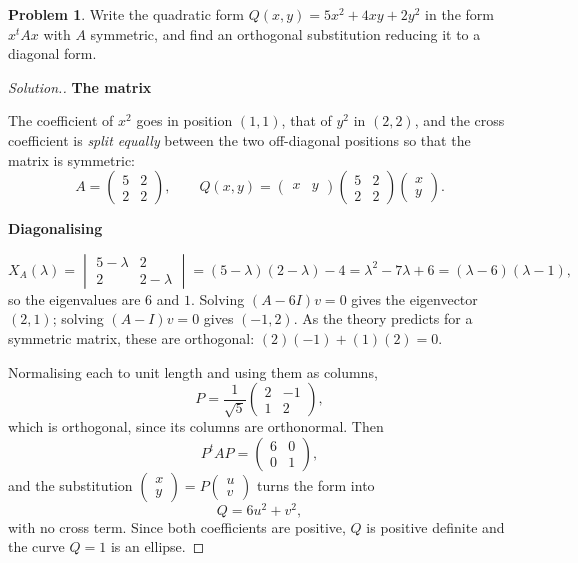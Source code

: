 \documentclass[11pt,a4paper]{article}
\theoremstyle{definition}
\newtheorem{problemx}{Problem}[section]
\newenvironment{problem}{\begin{problemx}}{\end{problemx}}
\newenvironment{solution}
  {\renewcommand{\qedsymbol}{}\begin{proof}[\textit{Solution}.]}
  {\end{proof}}
\newcommand{\subhead}[1]{%
  \par\medskip\noindent\textbf{#1}\par\nobreak\smallskip}
\begin{document}
\begin{problem}
Write the quadratic form $Q(x,y)=5x^2+4xy+2y^2$ in the form $x^tAx$ with $A$
symmetric, and find an orthogonal substitution reducing it to a diagonal form.
\end{problem}
\begin{solution}
\subhead{The matrix}
The coefficient of $x^2$ goes in position $(1,1)$, that of $y^2$ in $(2,2)$,
and the cross coefficient is \emph{split equally} between the two off-diagonal
positions so that the matrix is symmetric:
$$A=\begin{pmatrix}5&2\\2&2\end{pmatrix},\qquad
Q(x,y)=\begin{pmatrix}x&y\end{pmatrix}
\begin{pmatrix}5&2\\2&2\end{pmatrix}
\begin{pmatrix}x\\y\end{pmatrix}.$$

\subhead{Diagonalising}
$$X_A(\lambda)=\begin{vmatrix}5-\lambda&2\\2&2-\lambda\end{vmatrix}
=(5-\lambda)(2-\lambda)-4=\lambda^2-7\lambda+6=(\lambda-6)(\lambda-1),$$
so the eigenvalues are $6$ and $1$. Solving $(A-6I)v=0$ gives the eigenvector
$(2,1)$; solving $(A-I)v=0$ gives $(-1,2)$. As the theory predicts for a
symmetric matrix, these are orthogonal: $(2)(-1)+(1)(2)=0$.

Normalising each to unit length and using them as columns,
$$P=\frac{1}{\sqrt5}\begin{pmatrix}2&-1\\1&2\end{pmatrix},$$
which is orthogonal, since its columns are orthonormal. Then
$$P^tAP=\begin{pmatrix}6&0\\0&1\end{pmatrix},$$
and the substitution $\begin{pmatrix}x\\y\end{pmatrix}=P\begin{pmatrix}u\\v\end{pmatrix}$
turns the form into
$$Q=6u^2+v^2,$$
with no cross term. Since both coefficients are positive, $Q$ is positive
definite and the curve $Q=1$ is an ellipse.
\end{solution}
\end{document}
